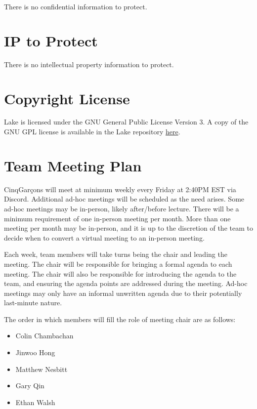 \documentclass{article}
\begin{document}
There is no confidential information to protect.

\section{IP to Protect}

There is no intellectual property information to protect.

\section{Copyright License}

Lake is licensed under the GNU General Public License Version 3.
A copy of the GNU GPL license is available in the Lake repository
\href{https://github.com/capstoneCEGJM/Lake/blob/main/LICENSE}
{here}.

\section{Team Meeting Plan}

CinqGarçons will meet at minimum weekly every Friday at 2:40PM EST via Discord. Additional ad-hoc meetings
will be scheduled as the need arises. Some ad-hoc meetings may be in-person, likely after/before
lecture. There will be a minimum requirement of one in-person meeting per month. More than one
meeting per month may be in-person, and it is up to the discretion of the team to decide when to
convert a virtual meeting to an in-person meeting.

\vspace{5mm}

Each week, team members will take turns being the chair and leading the meeting. The chair will be
responsible for bringing a formal agenda to each meeting. The chair will also be responsible for
introducing the agenda to the team, and ensuring the agenda points are addressed during the meeting.
Ad-hoc meetings may only have an informal unwritten agenda due to their potentially last-minute nature.

\vspace{5mm}

The order in which members will fill the role of meeting chair are as follows:
\begin{itemize}
	\item Colin Chambachan
	\item Jinwoo Hong
	\item Matthew Nesbitt
	\item Gary Qin
	\item Ethan Walsh
\end{itemize}
\end{document}

